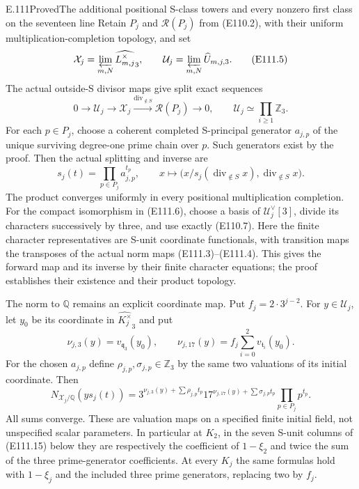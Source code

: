 \begin{statement}{E.111}{Proved}{The additional positional S-class towers and every nonzero first class on the seventeen line}
Retain $P_j$ and $\mathcal R(P_j)$ from (E110.2), with their
uniform multiplication-completion topology, and set
\[
 \mathcal X_j=\varprojlim_{m,N}\widehat{L_{m,j}^{\times}}_3,
 \qquad
 \mathcal U_j=\varprojlim_{m,N}\widehat U_{m,j,3}.
 \tag{E111.5}
\]
The actual outside-S divisor maps give split exact sequences
\[
 0\longrightarrow\mathcal U_j\longrightarrow\mathcal X_j
     \xrightarrow{\operatorname{div}_{\notin S}}
                \mathcal R(P_j)\longrightarrow0,
 \qquad \mathcal U_j\simeq\prod_{i\ge1}\mathbb Z_3.
 \tag{E111.6}
\]
For each $p\in P_j$, choose a coherent completed S-principal
generator $a_{j,p}$ of the unique surviving degree-one
prime chain over $p$. Such generators exist by the proof.
Then the actual splitting and inverse are
\[
 s_j(t)=\prod_{p\in P_j}a_{j,p}^{t_p},\qquad
 x\longmapsto\bigl(x/s_j(\operatorname{div}_{\notin S}x),
                         \operatorname{div}_{\notin S}x\bigr).
 \tag{E111.7}
\]
The product converges uniformly in every positional
multiplication completion. For the compact isomorphism in
(E111.6), choose a basis of $\mathcal U_j^\vee[3]$, divide
its characters successively by three, and use exactly
(E110.7). Here the finite character representatives are
S-unit coordinate functionals, with transition maps the
transposes of the actual norm maps (E111.3)--(E111.4).
This gives the forward map and its inverse by their finite
character equations; the proof establishes their existence
and their product topology.

The norm to $\mathbb Q$ remains an explicit coordinate
map. Put $f_j=2\cdot3^{j-2}$. For $y\in\mathcal U_j$,
let $y_0$ be its coordinate in $\widehat{K_j^\times}_3$ and put
\[
 \nu_{j,3}(y)=v_{\mathfrak q_3}(y_0),\qquad
 \nu_{j,17}(y)=f_j\sum_{i=0}^2v_{\mathfrak t_i}(y_0).
 \tag{E111.8}
\]
For the chosen $a_{j,p}$ define $\rho_{j,p},\sigma_{j,p}\in
\mathbb Z_3$ by the same two valuations of its initial
coordinate. Then
\[
 N_{\mathcal X_j/\mathbb Q}(y s_j(t))
 =3^{\nu_{j,3}(y)+\sum\rho_{j,p}t_p}
  17^{\nu_{j,17}(y)+\sum\sigma_{j,p}t_p}
                      \prod_{p\in P_j}p^{t_p}.
 \tag{E111.9}
\]
All sums converge. These are valuation maps on a specified
finite initial field, not unspecified scalar parameters.
In particular at $K_2$, in the seven S-unit columns of
(E111.15) below they are respectively the coefficient of
$1-\xi_2$ and twice the sum of the three prime-generator
coefficients. At every $K_j$ the same formulas hold with
$1-\xi_j$ and the included three prime generators, replacing
two by $f_j$.


\end{statement}
